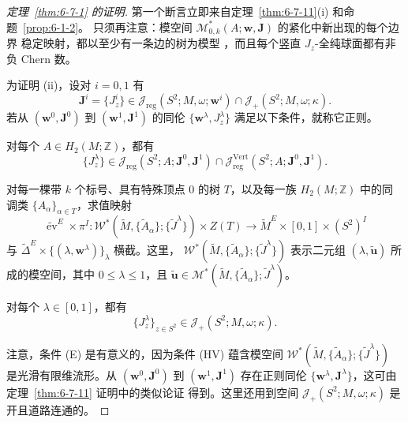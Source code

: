 \begin{proof}[定理~\ref{thm:6-7-1} 的证明]
第一个断言立即来自定理~\ref{thm:6-7-11}\textup{(i)} 和命题~\ref{prop:6-1-2}。
只须再注意：模空间 $\mathcal M^*_{0,k}(A;\mathbf w,\mathbf J)$ 的紧化中新出现的每个边界
稳定映射，都以至少有一条边的树为模型
，而且每个竖直 $J_z$-全纯球面都有非负 Chern 数。

为证明 (ii)，设对 $i=0,1$ 有
\[
  \mathbf J^i=\{J_z^i\}
  \in\mathcal J_{\mathrm{reg}}(S^2;M,\omega;\mathbf w^i)
    \cap\mathcal J_+(S^2;M,\omega;\kappa).
\]
若从 $(\mathbf w^0,\mathbf J^0)$ 到 $(\mathbf w^1,\mathbf J^1)$ 的同伦
$\{\mathbf w^\lambda,J_z^\lambda\}$ 满足以下条件，就称它正则。
\begin{description}[leftmargin=3.8em,style=nextline]
\item[\textup{(HV)}] 对每个 $A\in H_2(M;\mathbb Z)$，都有
\[
  \{J_z^\lambda\}
  \in\mathcal J_{\mathrm{reg}}(S^2;A;\mathbf J^0,\mathbf J^1)
  \cap\mathcal J_{\mathrm{reg}}^{\mathrm{Vert}}
    (S^2;A;\mathbf J^0,\mathbf J^1).
\]
\item[\textup{(E)}] 对每一棵带 $k$ 个标号、具有特殊顶点 $0$ 的树 $T$，以及每一族
$H_2(M;\mathbb Z)$ 中的同调类 $\{A_\alpha\}_{\alpha\in T}$，求值映射
\[
  \widetilde{\operatorname{ev}}^E\times\pi^I:
  \mathcal W^*(\widetilde M,\{\widetilde A_\alpha\};
    \{\widetilde J^\lambda\})\times Z(T)
  \longrightarrow\widetilde M^E\times[0,1]\times(S^2)^I
\]
与
$\widetilde\Delta^E\times
\{(\lambda,\mathbf w^\lambda)\}_\lambda$ 横截。这里，
$\mathcal W^*(\widetilde M,\{\widetilde A_\alpha\};
\{\widetilde J^\lambda\})$ 表示二元组 $(\lambda,\widetilde{\mathbf u})$ 所成的模空间，其中
$0\le\lambda\le1$，且
$\widetilde{\mathbf u}\in
\mathcal M^*(\widetilde M,\{\widetilde A_\alpha\};\widetilde J^\lambda)$。
\item[\textup{(P)}] 对每个 $\lambda\in[0,1]$，都有
\[
  \{J_z^\lambda\}_{z\in S^2}
  \in\mathcal J_+(S^2;M,\omega;\kappa).
\]
\end{description}
注意，条件 (E) 是有意义的，因为条件 (HV) 蕴含模空间
$\mathcal W^*(\widetilde M,\{\widetilde A_\alpha\};
\{\widetilde J^\lambda\})$ 是光滑有限维流形。从
$(\mathbf w^0,\mathbf J^0)$ 到 $(\mathbf w^1,\mathbf J^1)$ 存在正则同伦
$\{\mathbf w^\lambda,\mathbf J^\lambda\}$，这可由定理~\ref{thm:6-7-11} 证明中的类似论证
得到。这里还用到空间 $\mathcal J_+(S^2;M,\omega;\kappa)$ 是开且道路连通的。


\end{proof}
